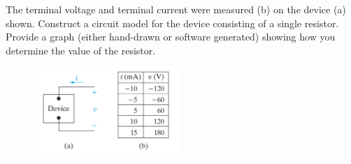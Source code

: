\documentclass[12pt]{article}
\begin{document}
The terminal voltage and terminal current were measured (b) on the device (a) shown. Construct a circuit model for the device consisting of a single resistor. Provide a graph (either hand-drawn or software generated) showing how you determine the value of the resistor. 
\begin{figure}[h!]
\centering 
\includegraphics[clip,width=0.49\textwidth]{P2-14.png}
\end{figure}
 
\end{document}
